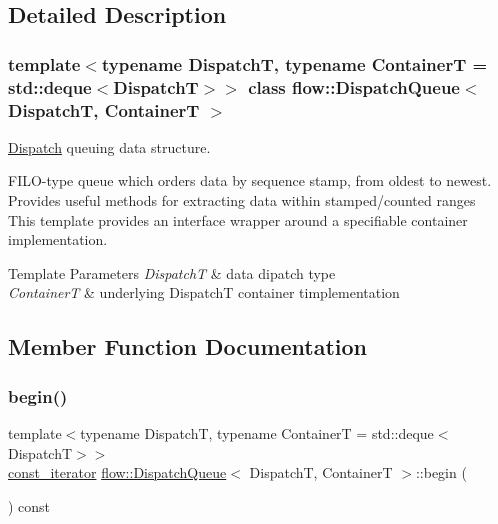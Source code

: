 \subsection{Detailed Description}
\subsubsection*{template$<$typename DispatchT, typename ContainerT = std\+::deque$<$\+Dispatch\+T$>$$>$\newline
class flow\+::\+Dispatch\+Queue$<$ Dispatch\+T, Container\+T $>$}

\hyperlink{classflow_1_1_dispatch}{Dispatch} queuing data structure. 

F\+I\+L\+O-\/type queue which orders data by sequence stamp, from oldest to newest. Provides useful methods for extracting data within stamped/counted ranges ~\newline
 This template provides an interface wrapper around a specifiable container implementation.


\begin{DoxyTemplParams}{Template Parameters}
{\em DispatchT} & data dipatch type \\
\hline
{\em ContainerT} & underlying {\ttfamily DispatchT} container timplementation \\
\hline
\end{DoxyTemplParams}


\subsection{Member Function Documentation}
\mbox{\label{classflow_1_1_dispatch_queue_a19612c628308b97497ffca62c9b2b420}} 
\subsubsection{\texorpdfstring{begin()}{begin()}}
{\footnotesize\ttfamily template$<$typename DispatchT, typename ContainerT = std\+::deque$<$\+Dispatch\+T$>$$>$ \\
\hyperlink{classflow_1_1_dispatch_queue_a307496fdc34a2d59e11114dabf85dc8a}{const\+\_\+iterator} \hyperlink{classflow_1_1_dispatch_queue}{flow\+::\+Dispatch\+Queue}$<$ DispatchT, ContainerT $>$\+::begin (\begin{DoxyParamCaption}{ }\end{DoxyParamCaption}) const\hspace{0.3cm}{\ttfamily [inline]}}



